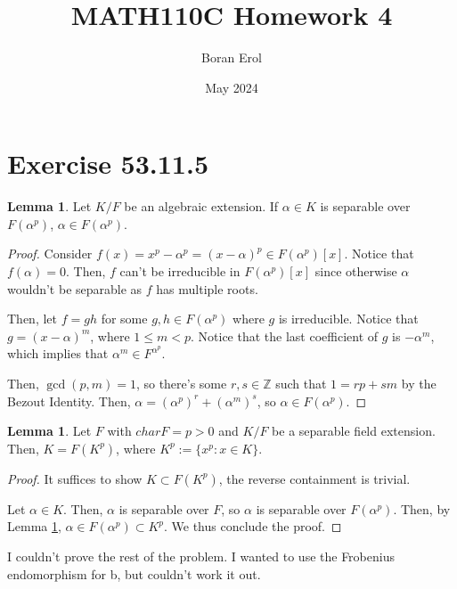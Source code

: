 \documentclass{article}
\title{MATH110C Homework 4}
\date{May 2024}
\author{Boran Erol}
\theoremstyle{definition}
\newtheorem{lemma}[theorem]{Lemma}
\newcommand{\Z}{\mathbb{Z}}
\begin{document}
\maketitle

\section{Exercise 53.11.5}

\begin{lemma}\label{idk_what_to_call_this}
    Let $K/F$ be an algebraic extension. If $\alpha \in K$ is separable over $F(\alpha^{p})$,
    $\alpha \in F(\alpha^{p})$.
\end{lemma}
\begin{proof}
    Consider $f(x) = x^{p} - \alpha^{p} = {(x - \alpha)}^{p} \in F(\alpha^{p})[x]$. Notice that $f(\alpha) = 0$.
    Then, $f$ can't be irreducible in $F(\alpha^{p})[x]$ since otherwise $\alpha$ wouldn't be separable as $f$
    has multiple roots.

    Then, let $f = gh$ for some $g,h \in F(\alpha^{p})$ where $g$ is irreducible. Notice that $g = {(x - \alpha)}^{m}$,
    where $1 \leq m < p$. Notice that the last coefficient of $g$ is $-\alpha^{m}$, which implies that $\alpha^{m} \in F^{\alpha^{p}}$.
    
    Then, $\gcd(p,m) = 1$, so there's some $r,s \in \Z$ such that $1 = rp + sm$ by the Bezout Identity. Then, $\alpha = {(\alpha^{p})}^{r} + 
    {(\alpha^{m})}^{s}$, so $\alpha \in F({\alpha^{p}})$.
\end{proof}

\begin{lemma}
    Let $F$ with $charF = p > 0$ and $K/F$ be a separable field extension.
    Then, $K = F(K^{p})$, where $K^{p} := \{ x^{p}: x \in K\}$.
\end{lemma}
\begin{proof}
    It suffices to show $K \subset F(K^{p})$, the reverse containment is trivial.

    Let $\alpha \in K$. Then, $\alpha$ is separable over $F$, so $\alpha$ is separable over $F(\alpha^{p})$.
    Then, by Lemma \ref{idk_what_to_call_this}, $\alpha \in F(\alpha^{p}) \subset K^{p}$. We thus conclude
    the proof.
\end{proof}

I couldn't prove the rest of the problem. I wanted to use the Frobenius endomorphism for b, but couldn't work it out.



\newpage
\end{document}
